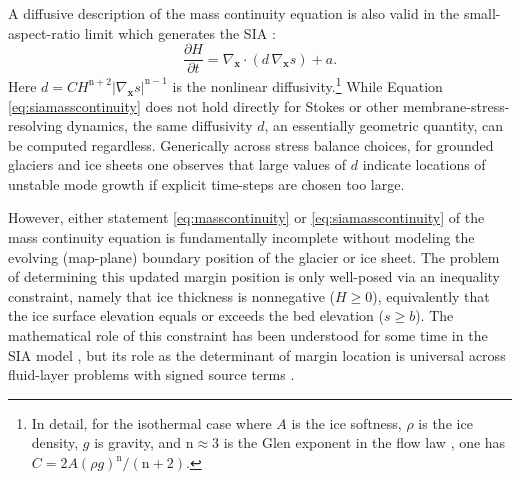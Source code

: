 \documentclass[review]{igs}
\newcommand\bx{\mathbf{x}}
\newcommand{\Divx}{\nabla_\bx \cdot}
\newcommand{\gradx}{\nabla_\bx}
\begin{document}
\newcommand{\nn}{\text{n}}
A diffusive description of the mass continuity equation is also valid in the small-aspect-ratio limit which generates the SIA \citep{SchoofHewitt2013}:
\begin{equation}
\frac{\partial H}{\partial t} = \Divx \left(d\, \gradx s \right) + a. \label{eq:siamasscontinuity}
\end{equation}
Here $d = C H^{\nn+2} |\gradx s|^{\nn-1}$ is the nonlinear diffusivity.\footnote{In detail, for the isothermal case where $A$ is the ice softness, $\rho$ is the ice density, $g$ is gravity, and $\nn\approx 3$ is the Glen exponent in the flow law \citep{GreveBlatter2009}, one has $C = 2 A (\rho g)^\nn/(\nn+2)$.}  While Equation \eqref{eq:siamasscontinuity} does not hold directly for Stokes or other membrane-stress-resolving dynamics, the same diffusivity $d$, an essentially geometric quantity, can be computed regardless.  Generically across stress balance choices, for grounded glaciers and ice sheets one observes that large values of $d$ indicate locations of unstable mode growth if explicit time-steps are chosen too large.

However, either statement \eqref{eq:masscontinuity} or \eqref{eq:siamasscontinuity} of the mass continuity equation is fundamentally incomplete without modeling the evolving (map-plane) boundary position of the glacier or ice sheet.  The problem of determining this updated margin position is only well-posed via an inequality constraint, namely that ice thickness is nonnegative ($H\ge 0$), equivalently that the ice surface elevation equals or exceeds the bed elevation ($s \ge b$).  The mathematical role of this constraint has been understood for some time in the SIA model \citep{Calvoetal2002,JouvetBueler2012,SchoofHewitt2013}, but its role as the determinant of margin location is universal across fluid-layer problems with signed source terms \citep{Bueler2021conservation}.
\end{document}
